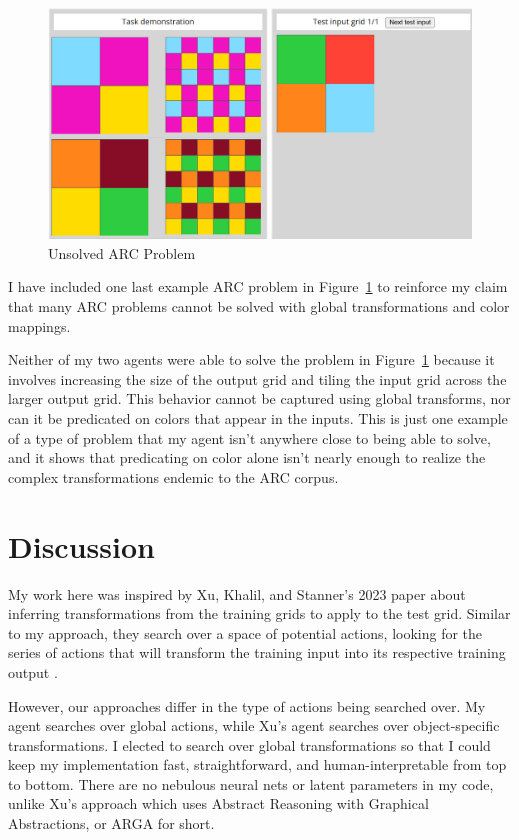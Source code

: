 \documentclass[letterpaper]{article} %
\begin{document}
\begin{figure}[htbp]
    \centering
    \includegraphics[width=\hsize]{unsolved.png}
    \caption{Unsolved ARC Problem}
    \label{fig:unsolved}
\end{figure}

\bigskip

I have included one last example ARC problem in Figure~\ref{fig:unsolved} to reinforce my claim that many ARC problems cannot be solved with global transformations and color mappings. 

\bigskip

Neither of my two agents were able to solve the problem in Figure~\ref{fig:unsolved} because it involves increasing the size of the output grid and tiling the input grid across the larger output grid. This behavior cannot be captured using global transforms, nor can it be predicated on colors that appear in the inputs. This is just one example of a type of problem that my agent isn't anywhere close to being able to solve, and it shows that predicating on color alone isn't nearly enough to realize the complex transformations endemic to the ARC corpus.


\section{Discussion}
My work here was inspired by Xu, Khalil, and Stanner's 2023 paper about inferring transformations from the training grids to apply to the test grid. Similar to my approach, they search over a space of potential actions, looking for the series of actions that will transform the training input into its respective training output \cite{Xu_Khalil_Sanner_2023}.

\bigskip

However, our approaches differ in the type of actions being searched over. My agent searches over global actions, while Xu's agent searches over object-specific transformations. I elected to search over global transformations so that I could keep my implementation fast, straightforward, and human-interpretable from top to bottom. There are no nebulous neural nets or latent parameters in my code, unlike Xu's approach which uses Abstract Reasoning with Graphical Abstractions, or ARGA for short.
\end{document}
